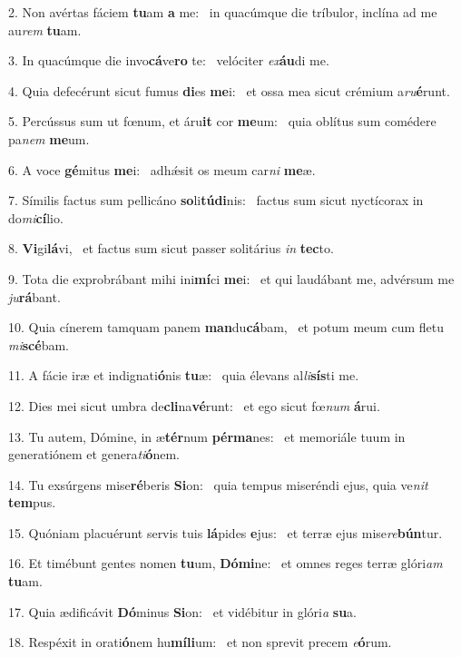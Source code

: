 2. Non avértas fáciem \textbf{tu}am \textbf{a} me: \ast\  in quacúmque die tríbulor, inclína ad me au\textit{rem} \textbf{tu}am.\

3. In quacúmque die invo\textbf{cá}ve\textbf{ro} te: \ast\  velóciter \textit{ex}\textbf{áu}di me.\

4. Quia defecérunt sicut fumus \textbf{di}es \textbf{me}i: \ast\  et ossa mea sicut crémium a\textit{ru}\textbf{é}runt.\

5. Percússus sum ut fœnum, et áru\textbf{it} cor \textbf{me}um: \ast\  quia oblítus sum comédere pa\textit{nem} \textbf{me}um.\

6. A voce \textbf{gé}mitus \textbf{me}i: \ast\  adhǽsit os meum car\textit{ni} \textbf{me}æ.\

7. Símilis factus sum pellicáno \textbf{so}li\textbf{tú}\textbf{di}nis: \ast\  factus sum sicut nyctícorax in do\textit{mi}\textbf{cí}lio.\

8. \textbf{Vi}gi\textbf{lá}vi, \ast\  et factus sum sicut passer solitárius \textit{in} \textbf{tec}to.\

9. Tota die exprobrábant mihi ini\textbf{mí}ci \textbf{me}i: \ast\  et qui laudábant me, advérsum me \textit{ju}\textbf{rá}bant.\

10. Quia cínerem tamquam panem \textbf{man}du\textbf{cá}bam, \ast\  et potum meum cum fletu \textit{mi}\textbf{scé}bam.\

11. A fácie iræ et indignati\textbf{ó}nis \textbf{tu}æ: \ast\  quia élevans al\textit{li}\textbf{sís}ti me.\

12. Dies mei sicut umbra de\textbf{cli}na\textbf{vé}runt: \ast\  et ego sicut fœ\textit{num} \textbf{á}rui.\

13. Tu autem, Dómine, in æ\textbf{tér}num \textbf{pér}\textbf{ma}nes: \ast\  et memoriále tuum in generatiónem et genera\textit{ti}\textbf{ó}nem.\

14. Tu exsúrgens mise\textbf{ré}beris \textbf{Si}on: \ast\  quia tempus miseréndi ejus, quia ve\textit{nit} \textbf{tem}pus.\

15. Quóniam placuérunt servis tuis \textbf{lá}pides \textbf{e}jus: \ast\  et terræ ejus mise\textit{re}\textbf{bún}tur.\

16. Et timébunt gentes nomen \textbf{tu}um, \textbf{Dó}\textbf{mi}ne: \ast\  et omnes reges terræ glóri\textit{am} \textbf{tu}am.\

17. Quia ædificávit \textbf{Dó}minus \textbf{Si}on: \ast\  et vidébitur in glóri\textit{a} \textbf{su}a.\

18. Respéxit in orati\textbf{ó}nem hu\textbf{mí}\textbf{li}um: \ast\  et non sprevit precem \textit{e}\textbf{ó}rum.\

